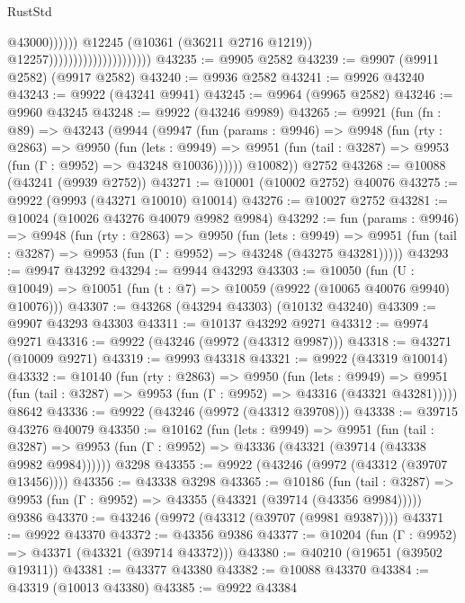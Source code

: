 \begin{lexlean}{RustStd}
\begin{coremodule}
                                                          @43000))))))
                                              @12245
                                              (@10361 (@36211 @2716 @1219))
                                              @12257)))))))))))))))))))))
@43235 := @9905 @2582
@43239 := @9907 (@9911 @2582) (@9917 @2582)
@43240 := @9936 @2582
@43241 := @9926 @43240
@43243 := @9922 (@43241 @9941)
@43245 := @9964 (@9965 @2582)
@43246 := @9960 @43245
@43248 := @9922 (@43246 @9989)
@43265 := @9921
    (fun (fn : @89) =>
    @43243
      (@9944
        (@9947
          (fun (params : @9946) =>
          @9948
            (fun (rty : @2863) =>
            @9950
              (fun (lets : @9949) =>
              @9951 (fun (tail : @3287) => @9953 (fun (Γ : @9952) => @43248 @10036))))))
        @10082))
    @2752
@43268 := @10088 (@43241 (@9939 @2752))
@43271 := @10001 (@10002 @2752) @40076
@43275 := @9922 (@9993 (@43271 @10010) @10014)
@43276 := @10027 @2752
@43281 := @10024 (@10026 @43276 @40079 @9982 @9984)
@43292 := fun (params : @9946) =>
  @9948
    (fun (rty : @2863) =>
    @9950
      (fun (lets : @9949) =>
      @9951 (fun (tail : @3287) => @9953 (fun (Γ : @9952) => @43248 (@43275 @43281)))))
@43293 := @9947 @43292
@43294 := @9944 @43293
@43303 := @10050
    (fun (U : @10049) => @10051 (fun (t : @7) => @10059 (@9922 (@10065 @40076 @9940) @10076)))
@43307 := @43268 (@43294 @43303) (@10132 @43240)
@43309 := @9907 @43293 @43303
@43311 := @10137 @43292 @9271
@43312 := @9974 @9271
@43316 := @9922 (@43246 (@9972 (@43312 @9987)))
@43318 := @43271 (@10009 @9271)
@43319 := @9993 @43318
@43321 := @9922 (@43319 @10014)
@43332 := @10140
    (fun (rty : @2863) =>
    @9950
      (fun (lets : @9949) =>
      @9951 (fun (tail : @3287) => @9953 (fun (Γ : @9952) => @43316 (@43321 @43281)))))
    @8642
@43336 := @9922 (@43246 (@9972 (@43312 @39708)))
@43338 := @39715 @43276 @40079
@43350 := @10162
    (fun (lets : @9949) =>
    @9951
      (fun (tail : @3287) =>
      @9953 (fun (Γ : @9952) => @43336 (@43321 (@39714 (@43338 @9982 @9984))))))
    @3298
@43355 := @9922 (@43246 (@9972 (@43312 (@39707 @13456))))
@43356 := @43338 @3298
@43365 := @10186
    (fun (tail : @3287) => @9953 (fun (Γ : @9952) => @43355 (@43321 (@39714 (@43356 @9984)))))
    @9386
@43370 := @43246 (@9972 (@43312 (@39707 (@9981 @9387))))
@43371 := @9922 @43370
@43372 := @43356 @9386
@43377 := @10204 (fun (Γ : @9952) => @43371 (@43321 (@39714 @43372)))
@43380 := @40210 (@19651 (@39502 @19311))
@43381 := @43377 @43380
@43382 := @10088 @43370
@43384 := @43319 (@10013 @43380)
@43385 := @9922 @43384

\end{coremodule}
\end{lexlean}
